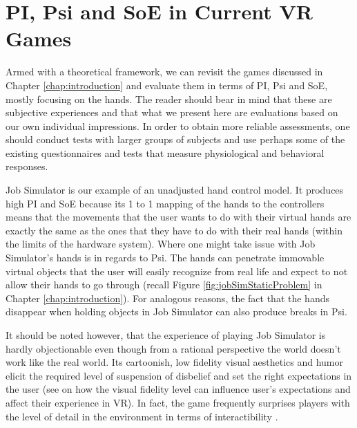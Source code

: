 \section{PI, Psi and SoE in Current VR Games}
\label{sec:soaRevisited}

Armed with a theoretical framework, we can revisit the games discussed in Chapter \ref{chap:introduction} and evaluate them in terms of PI, Psi and SoE, mostly focusing on the hands. The reader should bear in mind that these are subjective experiences and that what we present here are evaluations based on our own individual impressions. In order to obtain more reliable assessments, one should conduct tests with larger groups of subjects and use perhaps some of the existing questionnaires and tests that measure physiological and behavioral responses.

Job Simulator is our example of an unadjusted hand control model. It produces high PI and SoE because its 1 to 1 mapping of the hands to the controllers means that the movements that the user wants to do with their virtual hands are exactly the same as the ones that they have to do with their real hands (within the limits of the hardware system). Where one might take issue with Job Simulator's hands is in regards to Psi. The hands can penetrate immovable virtual objects that the user will easily recognize from real life and expect to not allow their hands to go through (recall Figure \ref{fig:jobSimStaticProblem} in Chapter \ref{chap:introduction}). For analogous reasons, the fact that the hands disappear when holding objects in Job Simulator can also produce breaks in Psi.


It should be noted however, that the experience of playing Job Simulator is hardly objectionable even though from a rational perspective the world doesn't work like the real world. Its cartoonish, low fidelity visual aesthetics and humor elicit the required level of suspension of disbelief and set the right expectations in the user (see \parencite{Nowak2003, Argelaguet2016} on how the visual fidelity level can influence user's expectations and affect their experience in VR). In fact, the game frequently surprises players with the level of detail in the environment in terms of interactibility \parencite{Schwartz2017}.


